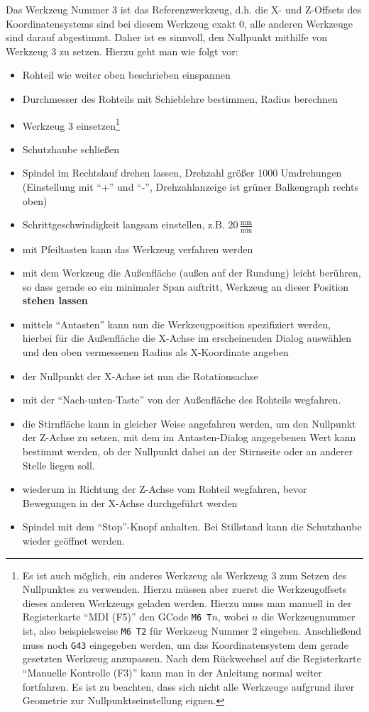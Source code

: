 \documentclass{\basedir/fablab-document}
\begin{document}
Das Werkzeug Nummer 3 ist das Referenzwerkzeug, d.h. die X- und Z-Offsets des Koordinatensystems sind bei diesem Werkzeug exakt $0$, alle anderen Werkzeuge sind darauf abgestimmt. Daher ist es sinnvoll, den Nullpunkt mithilfe von Werkzeug 3 zu setzen. Hierzu geht man wie folgt vor:
\begin{itemize}
	\item Rohteil wie weiter oben beschrieben einspannen
	\item Durchmesser des Rohteils mit Schieblehre bestimmen, Radius berechnen
	\item Werkzeug 3 einsetzen\footnote{Es ist auch möglich, ein anderes Werkzeug als Werkzeug 3 zum Setzen des Nullpunktes zu verwenden. Hierzu müssen aber zuerst die Werkzeugoffsets dieses anderen Werkzeugs geladen werden. Hierzu muss man manuell in der Registerkarte \enquote{MDI (F5)} den GCode \texttt{M6 T$n$}, wobei $n$ die Werkzeugnummer ist, also beispielsweise \texttt{M6 T2} für Werkzeug Nummer 2 eingeben. Anschließend muss noch \texttt{G43} eingegeben werden, um das Koordinatensystem dem gerade gesetzten Werkzeug anzupassen. Nach dem Rückwechsel auf die Registerkarte \enquote{Manuelle Kontrolle (F3)} kann man in der Anleitung normal weiter fortfahren. Es ist zu beachten, dass sich nicht alle Werkzeuge aufgrund ihrer Geometrie zur Nullpunktseinstellung eignen.}
	\item Schutzhaube schließen
	\item Spindel im Rechtslauf drehen lassen, Drehzahl größer 1000 Umdrehungen (Einstellung mit \enquote{+} und \enquote{-}, Drehzahlanzeige ist grüner Balkengraph rechts oben)
	\item Schrittgeschwindigkeit langsam einstellen, z.B. $20\,\frac{\mathrm{mm}}{\mathrm{min}}$
	\item mit Pfeiltasten kann das Werkzeug verfahren werden
	\item mit dem Werkzeug die Außenfläche (außen auf der Rundung) leicht berühren, so dass gerade so ein minimaler Span auftritt, Werkzeug an dieser Position \textbf{stehen lassen}
	\item mittels \enquote{Antasten} kann nun die Werkzeugposition spezifiziert werden, hierbei für die Außenfläche die X-Achse im erscheinenden Dialog auswählen und den oben vermessenen Radius als X-Koordinate angeben
	\item der Nullpunkt der X-Achse ist nun die Rotationsachse
	\item mit der \enquote{Nach-unten-Taste} von der Außenfläche des Rohteils wegfahren.
	\item die Stirnfläche kann in gleicher Weise angefahren werden, um den Nullpunkt der Z-Achse zu setzen, mit dem im Antasten-Dialog angegebenen Wert kann bestimmt werden, ob der Nullpunkt dabei an der Stirnseite oder an anderer Stelle liegen soll.
	\item wiederum in Richtung der Z-Achse vom Rohteil wegfahren, bevor Bewegungen in der X-Achse durchgeführt werden
	\item Spindel mit dem \enquote{Stop}-Knopf anhalten. Bei Stillstand kann die Schutzhaube wieder geöffnet werden.
\end{itemize}
\end{document}
